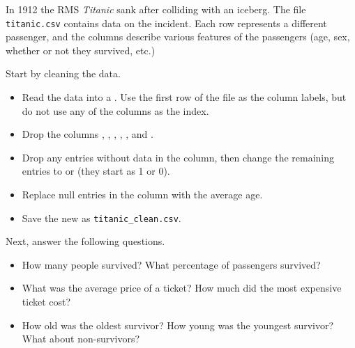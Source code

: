 \begin{problem}
In 1912 the RMS \emph{Titanic} sank after colliding with an iceberg.
The file \texttt{titanic.csv} contains data on the incident.
Each row represents a different passenger, and the columns describe various features of the passengers (age, sex, whether or not they survived, etc.)

Start by cleaning the data.
\begin{itemize}
    \item Read the data into a .
    Use the first row of the file as the column labels, but do not use any of the columns as the index.
    \item Drop the columns , , , , , and .
    \item Drop any entries without data in the  column, then change the remaining entries to  or  (they start as 1 or 0).
    \item Replace null entries in the  column with the average age.
    \item Save the new  as \texttt{titanic\_clean.csv}.
\end{itemize}
Next, answer the following questions.
\begin{itemize}
    \item How many people survived? What percentage of passengers survived?
    \item What was the average price of a ticket? How much did the most expensive ticket cost?
    \item How old was the oldest survivor? How young was the youngest survivor? What about non-survivors?
\end{itemize}



\end{problem}
